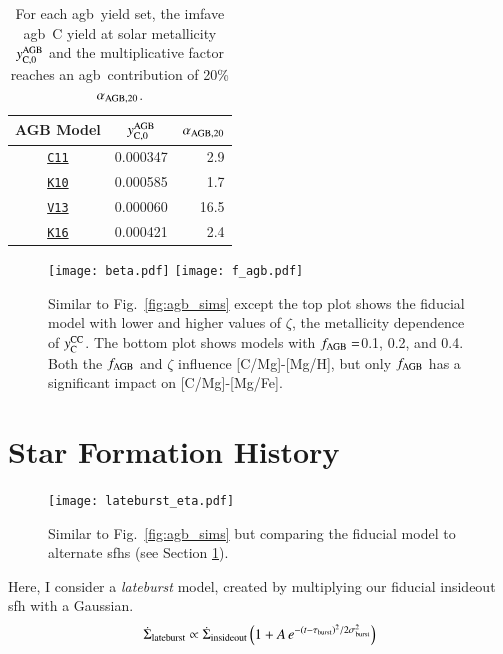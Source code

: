 \documentclass[12pt,oneside,letterpaper]{report}
\newcommand{\agb}{\gls{agb}}
\newcommand{\sfh}{\gls{sfh}}
\newcommand{\cxi}{\texttt{\hyperlink{C11}{C11}}}
\newcommand{\kx}{\texttt{\hyperlink{K10}{K10}}}
\newcommand{\kxvi}{\texttt{\hyperlink{K16}{K16}}}
\newcommand{\vxiii}{\texttt{\hyperlink{V13}{V13}}}
\newcommand{\caah}{[C/Mg]-[Mg/H]}
\newcommand{\caafe}{[C/Mg]-[Mg/Fe]}
\newcommand{\Ycc}{\ensuremath{y_{\rm C}^{\rm CC}}}
\begin{document}
\begin{table}
	\centering
    \caption[Low-Mass Stellar Carbon Yields at Solar Metallicity]{For each \agb\ yield set, the \gls{imfave} \agb\ C yield at solar metallicity $y_{\rm C, 0}^{\rm AGB}$ and the multiplicative factor reaches an \agb\ contribution of 20\% $\alpha_{\rm AGB, 20}$.}
	\label{tab:alpha_agb}
	\begin{tabular}{ccr} %
		\toprule 
		AGB Model & $y_{\rm C, 0}^{\rm AGB}$ & $\alpha_{\rm AGB, 20}$\\
        \midrule
        \cxi & 0.000347 & 2.9\\
        \kx & 0.000585 & 1.7\\
        \vxiii & 0.000060 & 16.5\\
        \kxvi & 0.000421 & 2.4\\
		\bottomrule
	\end{tabular}
\end{table}


\begin{figure}[htp]
\centering
\texttt{[image: beta.pdf]}
\texttt{[image: f\_agb.pdf]}

\caption[Adjusted Yield Models]{Similar to Fig.~\ref{fig:agb_sims} except the top plot shows the fiducial model with lower and higher values of $\zeta$, the metallicity dependence of $\Ycc$. The bottom plot shows models with $f_{\rm AGB}=$0.1, 0.2, and 0.4. Both the $f_{\rm AGB}$ and $\zeta$ influence \caah, but only $f_{\rm AGB}$ has a significant impact on \caafe.}
\label{fig:beta_f}
\end{figure}



\section{Star Formation History} \label{sec:sfh}


\begin{figure}[htp]
\centering
\texttt{[image: lateburst\_eta.pdf]}

\caption[Alternate Star-Formation-History Models]{Similar to Fig.~\ref{fig:agb_sims} but comparing the fiducial model to alternate \glspl{sfh} (see Section  \ref{sec:sfh}).}
\label{fig:sfh_models}

\end{figure}


Here, I consider a \textit{lateburst} model, created by multiplying our fiducial \gls{insideout} \sfh{} with a Gaussian.
\begin{equation}\label{eq:lateburst}
    \dot{\Sigma}_{\rm lateburst} \propto \dot{\Sigma}_{\rm insideout} \left(1 + A\,e^{-(t-\tau_{\rm burst})^2/2\sigma^2_{\rm burst}} \right)
\end{equation}
\end{document}
